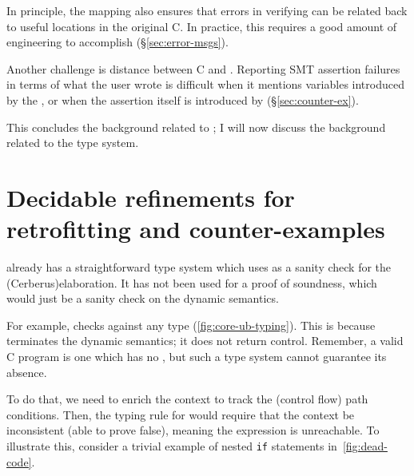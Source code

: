 In principle, the  mapping also ensures that errors in
verifying  can be related back to useful locations in the original C.
In practice, this requires a good amount of engineering to accomplish
(\S\ref{sec:error-msgs}).

Another challenge is distance between C and . Reporting SMT assertion
failures in terms of what the user wrote is difficult when it mentions
variables introduced by the , or when the assertion itself is
introduced by  (\S\ref{sec:counter-ex}).

This concludes the background related to ; I will now discuss the
background related to the  type system.

\section{Decidable refinements for retrofitting and counter-examples}\label{sec:decidable-refinements}

 already has a straightforward  type system which
 uses as a sanity check for the \kl(Cerberus){elaboration}. It has not been
used for a proof of soundness, which would just be a sanity check on the
dynamic semantics.

\begin{marginfigure}
    \small%
    \centering
    \begin{mathpar}
    \end{mathpar}
    \caption{Checking rule for the  pure expression as
    mentioned in \textcite[p91]{memarian2022cerberus}.}\label{fig:core-ub-typing}
\end{marginfigure}

For example,  checks against any type
(\cref{fig:core-ub-typing}).
This is because  terminates the dynamic
semantics; it does not return control. Remember, a valid C program is one which
has no , but such a type system cannot guarantee its absence.

To do that, we need to enrich the context to track the (control flow) path
conditions. Then, the typing rule for  would
require that the context be inconsistent (able to prove false), meaning
the expression is unreachable. To illustrate this, consider a trivial example
of nested \texttt{if} statements in~\cref{fig:dead-code}.

